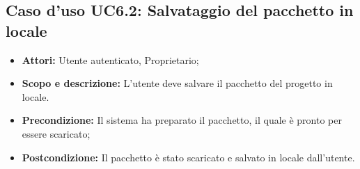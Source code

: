 \subsection{Caso d'uso UC6.2: Salvataggio del pacchetto in locale}
	\begin{itemize}
		\item \textbf{Attori:} Utente autenticato, Proprietario;
		\item \textbf{Scopo e descrizione:} L'utente deve salvare il pacchetto del progetto in locale.
		\item \textbf{Precondizione:} Il sistema ha preparato il pacchetto, il quale è pronto per essere scaricato;
		\item \textbf{Postcondizione:} Il pacchetto è stato scaricato e salvato in locale dall'utente.
	\end{itemize}